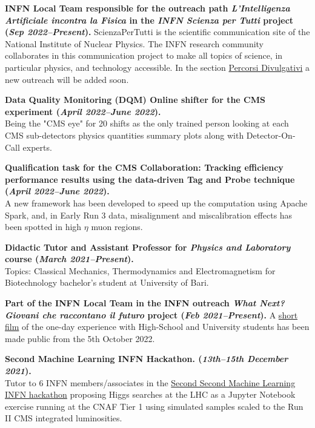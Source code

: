 \documentclass[11pt]{res}
\begin{document}
\begin{resume}
\textbf{INFN Local Team responsible for the outreach path \textit{L'Intelligenza Artificiale incontra la Fisica} in the \textit{INFN Scienza per Tutti} project (\textit{Sep 2022--Present}).}
ScienzaPerTutti is the scientific communication site of the National Institute of Nuclear Physics. The INFN research community collaborates in this communication project to make all topics of science, in particular physics, and technology accessible. In the section \href{https://scienzapertutti.infn.it/percorsi-divulgativi}{Percorsi Divulgativi} a new outreach will be added soon.

\textbf{Data Quality Monitoring (DQM) Online shifter for the CMS experiment (\textit{April 2022--June 2022}).}\\
Being the "CMS eye" for 20 shifts as the only trained person looking at each CMS sub-detectors physics quantities summary plots along with Detector-On-Call experts.

\textbf{Qualification task for the CMS Collaboration: Tracking efficiency performance results using the data-driven Tag and Probe technique (\textit{April 2022--June 2022}).}\\
A new framework has been developed to speed up the computation using Apache Spark, and, in Early Run 3 data, misalignment and miscalibration effects has been spotted in high $\eta$ muon regions.

\textbf{Didactic Tutor and Assistant Professor for \textit{Physics and Laboratory} course (\textit{March 2021--Present}).}\\
Topics: Classical Mechanics, Thermodynamics and Electromagnetism for Biotechnology bachelor's student at University of Bari.

\textbf{Part of the INFN Local Team in the INFN outreach \textit{What Next? Giovani che raccontano il futuro} project (\textit{Feb 2021--Present}).}
A \href{https://next.infn.it/il-cortometraggio/}{short film} of the one-day experience with High-School and University students has been made public from the 5th October 2022.

\textbf{Second Machine Learning INFN Hackathon. (\textit{13th--15th December 2021}).}\\ 
Tutor to 6 INFN members/associates in the \href{https://agenda.infn.it/event/28565/contributions/148551/}{Second Second Machine Learning INFN hackathon} proposing Higgs searches at the LHC as a Jupyter Notebook exercise running at the CNAF Tier 1 using simulated samples scaled to the Run II CMS integrated luminosities.



\end{resume}
\end{document}

